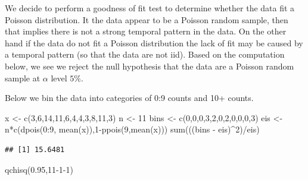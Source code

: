 \documentclass[
]{book}
\newenvironment{Shaded}{\begin{snugshade}}{\end{snugshade}}
\newcommand{\DecValTok}[1]{\textcolor[rgb]{0.00,0.00,0.81}{#1}}
\newcommand{\FloatTok}[1]{\textcolor[rgb]{0.00,0.00,0.81}{#1}}
\newcommand{\FunctionTok}[1]{\textcolor[rgb]{0.00,0.00,0.00}{#1}}
\newcommand{\NormalTok}[1]{#1}
\newcommand{\OtherTok}[1]{\textcolor[rgb]{0.56,0.35,0.01}{#1}}
\newcommand{\SpecialCharTok}[1]{\textcolor[rgb]{0.00,0.00,0.00}{#1}}
\begin{document}
We decide to perform a goodness of fit test to determine whether the data fit a Poisson distribution. It the data appear to be a Poisson random sample, then that implies there is not a strong temporal pattern in the data. On the other hand if the data do not fit a Poisson distribution the lack of fit may be caused by a temporal pattern (so that the data are not iid). Based on the computation below, we see we reject the null hypothesis that the data are a Poisson random sample at \(\alpha\) level \(5\%\).

Below we bin the data into categories of 0:9 counts and 10+ counts.

\begin{Shaded}
\begin{Highlighting}[]
\NormalTok{x }\OtherTok{\textless{}{-}} \FunctionTok{c}\NormalTok{(}\DecValTok{3}\NormalTok{,}\DecValTok{6}\NormalTok{,}\DecValTok{14}\NormalTok{,}\DecValTok{11}\NormalTok{,}\DecValTok{6}\NormalTok{,}\DecValTok{4}\NormalTok{,}\DecValTok{4}\NormalTok{,}\DecValTok{3}\NormalTok{,}\DecValTok{8}\NormalTok{,}\DecValTok{11}\NormalTok{,}\DecValTok{3}\NormalTok{)}
\NormalTok{n }\OtherTok{\textless{}{-}} \DecValTok{11}
\NormalTok{bins }\OtherTok{\textless{}{-}} \FunctionTok{c}\NormalTok{(}\DecValTok{0}\NormalTok{,}\DecValTok{0}\NormalTok{,}\DecValTok{0}\NormalTok{,}\DecValTok{3}\NormalTok{,}\DecValTok{2}\NormalTok{,}\DecValTok{0}\NormalTok{,}\DecValTok{2}\NormalTok{,}\DecValTok{0}\NormalTok{,}\DecValTok{0}\NormalTok{,}\DecValTok{0}\NormalTok{,}\DecValTok{3}\NormalTok{)}
\NormalTok{eis }\OtherTok{\textless{}{-}}\NormalTok{ n}\SpecialCharTok{*}\FunctionTok{c}\NormalTok{(}\FunctionTok{dpois}\NormalTok{(}\DecValTok{0}\SpecialCharTok{:}\DecValTok{9}\NormalTok{, }\FunctionTok{mean}\NormalTok{(x)),}\DecValTok{1}\SpecialCharTok{{-}}\FunctionTok{ppois}\NormalTok{(}\DecValTok{9}\NormalTok{,}\FunctionTok{mean}\NormalTok{(x)))}
\FunctionTok{sum}\NormalTok{(((bins }\SpecialCharTok{{-}}\NormalTok{ eis)}\SpecialCharTok{\^{}}\DecValTok{2}\NormalTok{)}\SpecialCharTok{/}\NormalTok{eis)}
\end{Highlighting}
\end{Shaded}

\begin{verbatim}
## [1] 15.6481
\end{verbatim}

\begin{Shaded}
\begin{Highlighting}[]
\FunctionTok{qchisq}\NormalTok{(}\FloatTok{0.95}\NormalTok{,}\DecValTok{11{-}1{-}1}\NormalTok{)}
\end{Highlighting}
\end{Shaded}
\end{document}
